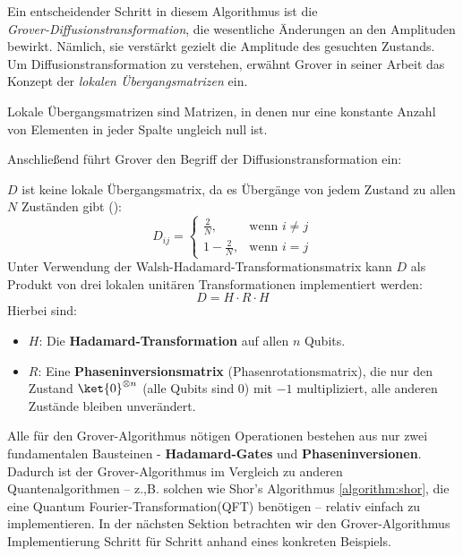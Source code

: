 Ein entscheidender Schritt in diesem Algorithmus ist die\\ \textit{Grover-Diffusionstransformation}, die wesentliche Änderungen an den Amplituden bewirkt. Nämlich, sie verstärkt gezielt die Amplitude des gesuchten Zustands. Um Diffusionstransformation zu verstehen, erwähnt Grover in seiner Arbeit das Konzept der \textit{lokalen Übergangsmatrizen} ein.

\begin{definition}
Lokale Übergangsmatrizen sind Matrizen, in denen nur eine konstante Anzahl von Elementen in jeder Spalte ungleich null ist.
\end{definition}

Anschließend führt Grover den Begriff der Diffusionstransformation ein:

\begin{definition}
\( D \) ist keine lokale Übergangsmat\-rix, da es Übergänge von jedem Zustand zu allen \( N \) Zuständen gibt (\cite{zotero-1211}):
$$
D_{ij} = 
\begin{cases}
\frac{2}{N}, & \text{wenn } i \ne j \\
1 - \frac{2}{N}, & \text{wenn } i = j
\end{cases}
$$
Unter Verwendung der Walsh-Hadamard-Transformationsmatrix kann \( D \) als Produkt von drei lokalen unitären Transformationen implementiert werden:
$$
D = H \cdot R \cdot H
$$
Hierbei sind:
\begin{itemize}
\item $H$: Die \textbf{Hadamard-Transformation} auf allen $n$ Qubits.
\item $R$: Eine \textbf{Phaseninversionsmatrix} (Phasenrotationsmatrix), die nur den Zustand $\ket{0}^{\otimes n}$ (alle Qubits sind 0) mit $-1$ multipliziert, alle anderen Zustände bleiben unverändert.
\end{itemize}
\end{definition}

Alle für den Grover-Algorithmus nötigen Operationen bestehen aus nur zwei fundamentalen Bausteinen - \textbf{Hadamard-Gates} und \textbf{Phaseninversionen}. Dadurch ist der Grover-Algorithmus im Vergleich zu anderen Quantenalgorithmen – z.,B. solchen wie Shor's Algorithmus \ref{algorithm:shor}, die eine Quantum Fourier-Transformation(QFT) benötigen – relativ einfach zu implementieren. In der nächsten Sektion betrachten wir den Grover-Algorithmus Implementierung Schritt für Schritt anhand eines konkreten Beispiels.


